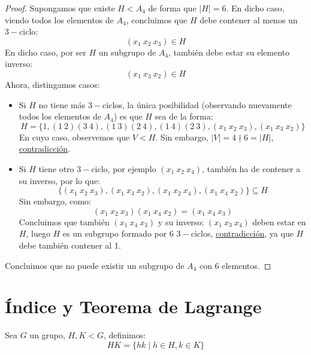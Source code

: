 \begin{ejemplo}
    \begin{proof}
        Supongamos que existe $H < A_4$ de forma que $|H| = 6$. En dicho caso, viendo todos los elementos de $A_4$, concluimos que $H$ debe contener al menos un $3-$ciclo: 
        \begin{equation*}
            (x_1\ x_2\ x_3) \in  H
        \end{equation*}
        En dicho caso, por ser $H$ un subgrupo de $A_4$, también debe estar su elemento inverso:
        \begin{equation*}
            (x_1\ x_3\ x_2) \in H
        \end{equation*}
        Ahora, distingamos casos:
        \begin{itemize}
            \item Si $H$ no tiene más $3-$ciclos, la única posibilidad (observando nuevamente todos los elementos de $A_4$) es que $H$ sea de la forma:
                \begin{equation*}
                    H = \{1, (1\ 2)(3\ 4), (1\ 3)(2\ 4), (1\ 4)(2\ 3), (x_1\ x_2\ x_3), (x_1\ x_3\ x_2)\}
                \end{equation*}
                En cuyo caso, observemos que $V < H$. Sin embargo, $|V| = 4 \nmid 6 = |H|$, \underline{contradicción}.
            \item Si $H$ tiene otro $3-$ciclo, por ejemplo $(x_1\ x_2\ x_4)$, también ha de contener a su inverso, por lo que:
                \begin{equation*}
                    \{(x_1\ x_2\ x_3), (x_1\ x_3\ x_2), (x_1\ x_2\ x_4), (x_1\ x_4\ x_2)\} \subseteq H
                \end{equation*}
                Sin embargo, como:
                \begin{equation*}
                    (x_1\ x_2\ x_3)(x_1\ x_4\ x_2) = (x_1\ x_4\ x_3)
                \end{equation*}
                Concluimos que también $(x_1\ x_4\ x_3)$ y su inverso: $(x_1\ x_3\ x_4)$ deben estar en $H$, luego $H$ es un subgrupo formado por 6 $3-$ciclos, \underline{contradicción}, ya que $H$ debe también contener al 1.
        \end{itemize}
        Concluimos que no puede existir un subgrupo de $A_4$ con 6 elementos.
    \end{proof}
\end{ejemplo}

\section{Índice y Teorema de Lagrange}
\begin{definicion} %
    Sea $G$ un grupo, $H, K < G$, definimos:
    \begin{equation*}
        HK = \{hk \mid h\in H, k \in K\}
    \end{equation*}
\end{definicion}

